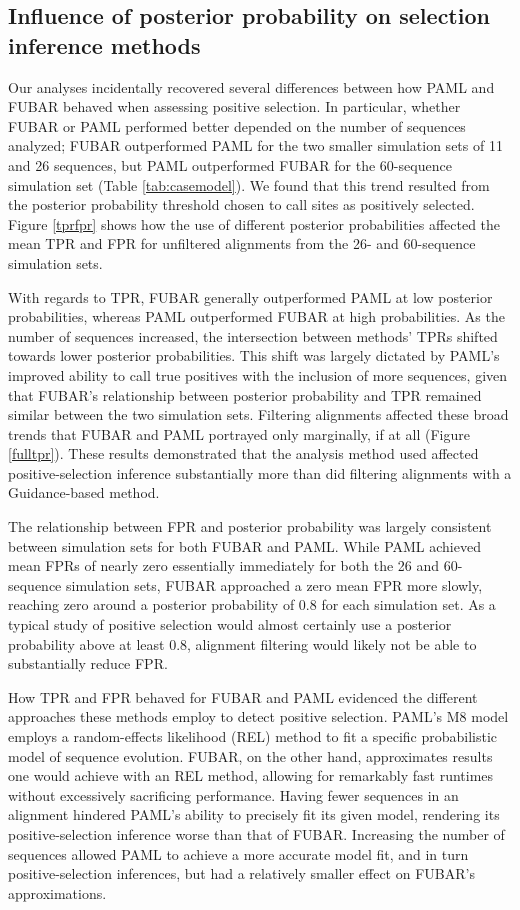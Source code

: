 \documentclass[11pt]{article}
\begin{document}
\subsection*{Influence of posterior probability on selection inference methods}

Our analyses incidentally recovered several differences between how PAML and FUBAR behaved when assessing positive selection. In particular, whether FUBAR or PAML performed better depended on the number of sequences analyzed; FUBAR outperformed PAML for the two smaller simulation sets of 11 and 26 sequences, but PAML outperformed FUBAR for the 60-sequence simulation set (Table \ref{tab:casemodel}). We found that this trend resulted from the posterior probability threshold chosen to call sites as positively selected. Figure \ref{tprfpr} shows how the use of different posterior probabilities affected the mean TPR and FPR for unfiltered alignments from the 26- and 60-sequence simulation sets. 

With regards to TPR, FUBAR generally outperformed PAML at low posterior probabilities, whereas PAML outperformed FUBAR at high probabilities. As the number of sequences increased, the intersection between methods' TPRs shifted towards lower posterior probabilities. This shift was largely dictated by PAML's improved ability to call true positives with the inclusion of more sequences, given that FUBAR's relationship between posterior probability and TPR remained similar between the two simulation sets.  Filtering alignments affected these broad trends that FUBAR and PAML portrayed only marginally, if at all (Figure \ref{fulltpr}). These results demonstrated that the analysis method used affected positive-selection inference substantially more than did filtering alignments with a Guidance-based method. 

The relationship between FPR and posterior probability was largely consistent between simulation sets for both FUBAR and PAML. While PAML achieved mean FPRs of nearly zero essentially immediately for both the 26 and 60-sequence simulation sets, FUBAR approached a zero mean FPR more slowly, reaching zero around a posterior probability of 0.8 for each simulation set. As a typical study of positive selection would almost certainly use a posterior probability above at least 0.8, alignment filtering would likely not be able to substantially reduce FPR.

How TPR and FPR behaved for FUBAR and PAML evidenced the different approaches these methods employ to detect positive selection. PAML's M8 model employs a random-effects likelihood (REL) method \citep{NielsenYang1998} to fit a specific probabilistic model of sequence evolution. FUBAR, on the other hand, approximates results one would achieve with an REL method, allowing for remarkably fast runtimes without excessively sacrificing performance. Having fewer sequences in an alignment hindered PAML's ability to precisely fit its given model, rendering its positive-selection inference worse than that of FUBAR. Increasing the number of sequences allowed PAML to achieve a more accurate model fit, and in turn positive-selection inferences, but had a relatively smaller effect on FUBAR's approximations.
\end{document}
